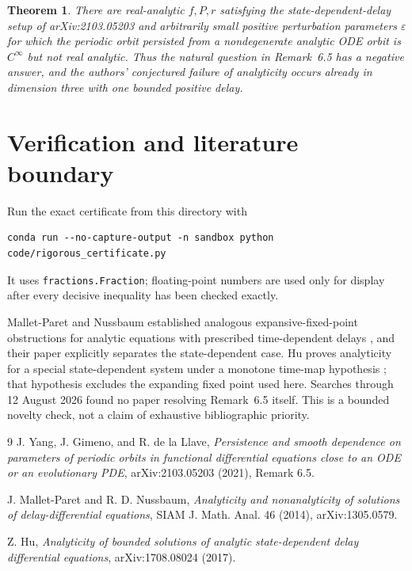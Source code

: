 \documentclass[11pt]{article}
\newtheorem{theorem}{Theorem}
\newcommand{\e}{\varepsilon}
\begin{document}
\begin{theorem}\label{thm:answer}
There are real-analytic $f,P,r$ satisfying the state-dependent-delay setup
of arXiv:2103.05203 and arbitrarily small positive perturbation parameters
$\e$ for which the periodic orbit persisted from a nondegenerate analytic
ODE orbit is $C^\infty$ but not real analytic.  Thus the natural question in
Remark~6.5 has a negative answer, and the authors' conjectured failure of
analyticity occurs already in dimension three with one bounded positive
delay.
\end{theorem}

\section*{Verification and literature boundary}

Run the exact certificate from this directory with
\begin{verbatim}
conda run --no-capture-output -n sandbox python code/rigorous_certificate.py
\end{verbatim}
It uses \texttt{fractions.Fraction}; floating-point numbers are used only for
display after every decisive inequality has been checked exactly.

Mallet-Paret and Nussbaum established analogous expansive-fixed-point
obstructions for analytic equations with prescribed time-dependent delays
\cite{MPN}, and their paper explicitly separates the state-dependent case.
Hu proves analyticity for a special state-dependent system under a monotone
time-map hypothesis \cite{Hu}; that hypothesis excludes the expanding fixed
point used here.  Searches through 12 August 2026 found no paper resolving
Remark~6.5 itself.  This is a bounded novelty check, not a claim of exhaustive
bibliographic priority.

\begin{thebibliography}{9}
J. Yang, J. Gimeno, and R. de la Llave,
\emph{Persistence and smooth dependence on parameters of periodic orbits in
functional differential equations close to an ODE or an evolutionary PDE},
arXiv:2103.05203 (2021), Remark 6.5.

J. Mallet-Paret and R. D. Nussbaum,
\emph{Analyticity and nonanalyticity of solutions of delay-differential
equations}, SIAM J. Math. Anal. 46 (2014), arXiv:1305.0579.

Z. Hu,
\emph{Analyticity of bounded solutions of analytic state-dependent delay
differential equations}, arXiv:1708.08024 (2017).
\end{thebibliography}
\end{document}
